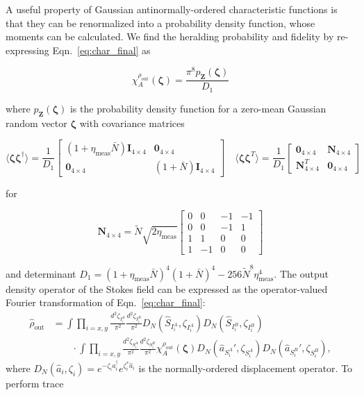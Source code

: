 \documentclass[aps,twocolumn,secnumarabic,amsmath,amssymb,pra,groupedaddress,
showpacs, showkeys]{revtex4-1}
\newcommand{\pna}[1]{\left(#1\right)}
\newcommand{\eqn}[1]{
\begin{equation}
	#1
\end{equation}
}
\begin{document}
A useful property of Gaussian antinormally-ordered characteristic functions is
that they can be renormalized into a probability density function, whose
moments can be calculated. We find the heralding probability and fidelity by
re-expressing Eqn.~\ref{eq:char_final} as
\eqn{
\chi_A^{\rho_{\textrm{out}}}\pna{\bm{\zeta}}=\frac{\pi^8 p_{\mathbf{Z}}\pna{\bm{\zeta}}}{D_1}
}
where $p_{\mathbf{Z}}\pna{\bm{\zeta}}$ is the probability density function for
a zero-mean Gaussian random vector $\bm{\zeta}$ with covariance matrices
\eqn{ 
\langle \bm{\zeta}\bm{\zeta}^{\dagger}\rangle=\frac{1}{D_1}\left[ 
\begin{array}{cc}
\pna{1+\eta_{\textrm{meas}} \bar{N}} \mathbf{I}_{4\times 4} &  \mathbf{0}_{4\times 4} \\
 \mathbf{0}_{4\times 4} & \pna{1+\bar{N}} \mathbf{I}_{4\times 4}
\end{array} 
\right]
\quad
\langle \bm{\zeta}\bm{\zeta}^{T}\rangle=\frac{1}{D_1}\left[ 
\begin{array}{cc}
 \mathbf{0}_{4\times 4} & \mathbf{N}_{4\times 4} \\
 \mathbf{N}_{4\times 4}^T & \mathbf{0}_{4\times 4}
\end{array} 
\right]\label{eq:chap3:moments}
}
for 
\eqn{
\mathbf{N}_{4\times 4}=\tilde{N}\sqrt{2\eta_{\textrm{meas}}}\left[ 
\begin{array}{cccc}
0 & 0 & -1 & -1\\
0 & 0 & -1 & 1\\
1 & 1 & 0 & 0\\
1 & -1 & 0 & 0
\end{array} 
\right]
}
and determinant $D_1=\pna{1+\eta_{\textrm{meas}} \bar{N}}^4
\pna{1+\bar{N}}^4-256 \tilde{N}^8 \eta_{\textrm{meas}}^4$. The output density
operator of the Stokes field can be expressed as the operator-valued Fourier
transformation of Eqn.~\ref{eq:char_final}:
\begin{align}
\hat{\rho}_{\textrm{out}}& =\int 
\prod_{i=x,y}
\frac{d^2 \zeta_{I_i^A}}{\pi^2} 
\frac{d^2 \zeta_{I_i^B}}{\pi^2} 
D_N\pna{\hat{S}_{I_i^A},\zeta_{I_i^A}} 
D_N\pna{\hat{S}_{I_i^B},\zeta_{I_i^B}}  \nonumber \\
& \qquad \cdot \int 
\prod_{i=x,y}
\frac{d^2 \zeta_{S_i^A}}{\pi^2} 
\frac{d^2 \zeta_{S_i^B}}{\pi^2}
\chi_A^{\rho_{\textrm{out}}}\pna{\bm{\zeta}} 
D_N\pna{\hat{a}_{S_i^A}',\zeta_{S_i^A}} 
D_N\pna{\hat{a}_{S_i^B}',\zeta_{S_i^B}},
\label{eq:fourier_char}
\end{align}
where $D_N\pna{\hat{a}_i,\zeta_i}=e^{-\zeta_i \hat{a}_i^{\dagger}}e^{\zeta_i^*
  \hat{a}_i}$ is the normally-ordered displacement operator. To perform trace
\end{document}
